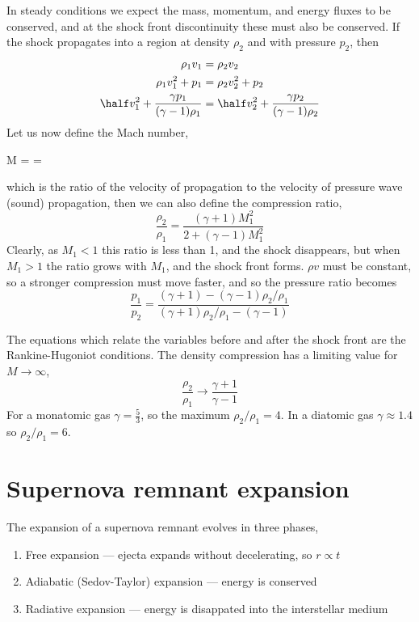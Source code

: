 In steady conditions we expect the mass, momentum, and energy fluxes
to be conserved, and at the shock front discontinuity these must also
be conserved. If the shock propagates into a region at density
$\rho_2$ and with pressure $p_2$, then
\begin{align*}
  \rho_1 v_1 &= \rho_2 v_2 \\
\rho_1 v_1^2 + p_1 &= \rho_2 v_2^2 + p_2 \\
\half v_1^2 + \frac{\gamma p_1}{(\gamma-1)\rho_1} &= \half v_2^2 + \frac{\gamma p_2}{(\gamma-1) \rho_2}
\end{align*}
Let us now define the Mach number,
\begin{fequation}
  \label{eq:73}
  M =  = 
\end{fequation}
which is the ratio of the velocity of propagation to the velocity of
pressure wave (sound) propagation, then we can also define the
compression ratio,
\begin{equation}
  \label{eq:74}
  \frac{\rho_2}{\rho_1} = \frac{(\gamma+1)M_1^2}{2+(\gamma-1)M_1^2}
\end{equation}
Clearly, as $M_1 < 1$ this ratio is less than 1, and the shock
disappears, but when $M_1>1$ the ratio grows with $M_1$, and the shock
front forms. $\rho v$ must be constant, so a stronger compression must
move faster, and so the pressure ratio becomes
\begin{equation}
  \label{eq:75}
  \frac{p_1}{p_2} = \frac{(\gamma+1) - (\gamma-1) \rho_2/\rho_1}{(\gamma+1)\rho_2/\rho_1 - (\gamma-1)}
\end{equation}

The equations which relate the variables before and after the shock front are the Rankine-Hugoniot conditions. The density compression has a limiting value for $M \to \infty$,
\begin{equation}
  \label{eq:76}
  \frac{\rho_2}{\rho_1} \to \frac{\gamma+1}{\gamma-1}
\end{equation}
For a monatomic gas $\gamma = \frac{5}{3}$, so the maximum $\rho_2/\rho_1 = 4$. In a diatomic gas $\gamma \approx 1.4$ so $\rho_2/\rho_1 = 6$.

\section{Supernova remnant expansion}
\label{sec:supern-remn-expans}

The expansion of a supernova remnant evolves in three phases,
\begin{enumerate}
\item Free expansion --- ejecta expands without decelerating, so $r \propto t$
\item Adiabatic (Sedov-Taylor) expansion --- energy is conserved
\item Radiative expansion --- energy is disappated into the interstellar medium
\end{enumerate}

